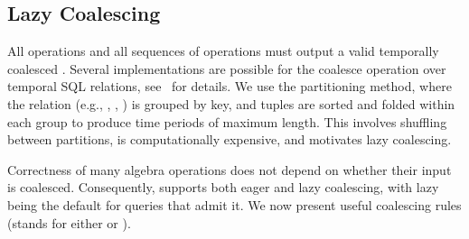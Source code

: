 \subsection{Lazy Coalescing}
\label{sec:sys:coal}


All operations and all sequences of operations must output a valid
temporally coalesced \tg.  Several implementations are possible for
the coalesce operation over temporal SQL relations,
see~\cite{DBLP:conf/vldb/BohlenSS96} for details.  We use the
partitioning method, where the relation (e.g., \tv, \te, \trg) is
grouped by key, and tuples are sorted and folded within each group to
produce time periods of maximum length.  This involves shuffling
between partitions, is computationally expensive, and motivates
lazy coalescing.

Correctness of many \tg algebra operations does not depend on whether
their input is coalesced.  Consequently, \ql supports both eager and
lazy coalescing, with lazy being the default for queries that admit
it.  We now present useful coalescing rules (\ttt stands for either
\trg or \tve).

%


